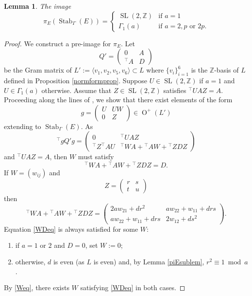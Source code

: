 \documentclass[11pt]{article}
\newtheorem{lem}[thm]{Lemma}
\newcommand{\ZZ}{\mathbb{Z}}
\newcommand{\la}{\langle}
\newcommand{\ra}{\rangle}
\newcommand{\opn}{\operatorname}
\newcommand{\beq}{\begin{equation*}}
\newcommand{\eeq}{\end{equation*}}
\newcommand{\bpm}{\begin{pmatrix}}
\newcommand{\epm}{\end{pmatrix}}
\begin{document}
\begin{lem}\label{piEimglem}
    The image
    \beq
    \pi_E(\opn{Stab}_{\Gamma}(E))
    =
    \begin{cases}
      \opn{SL}(2, \ZZ) & \text{if $a=1$} \\
      \Gamma_1(a) & \text{if $a=2, p$ or $2p$}.
    \end{cases}
    \eeq
    \end{lem}
  \begin{proof}
    We construct a pre-image for $\pi_E$.
    Let
    \beq
    Q'=
    \bpm 0 & A \\ {}^{\intercal}A & D \epm
    \eeq
    be the Gram matrix of $L':=\la v_1, v_2, v_5, v_6 \ra \subset L$ where $\{ v_i \}_{i=1}^6$ is the $\ZZ$-basis of $L$ defined in Proposition \ref{normformprop}.
    Suppose $U \in \opn{SL}(2, \ZZ)$ if $a=1$ and $U \in \Gamma_1(a)$ otherwise.
    Assume that $Z \in \opn{SL}(2, \ZZ)$ satisfies ${}^{\intercal}UAZ = A$.
    Proceeding along the lines of  \cite{Scattone},  we show that there exist elements of the form
  \beq
  g = \bpm U & UW \\ 0 & Z \epm \in \opn{O}^+(L')
  \eeq
  extending to $\opn{Stab}_{\Gamma}(E)$.
  As
  \beq
      {^{\intercal}}g Q' g =
      \bpm 0 & {^{\intercal}}UAZ \\
           {^{\intercal}}Z^{\intercal}AU & {^{\intercal}}WA +{^{\intercal}}AW + {^{\intercal}}ZDZ
           \epm
           \eeq
           and ${}^{\intercal}UAZ = A$, then $W$ must satisfy
           \begin{equation}\label{WDeq}
             {^{\intercal}}WA +{^{\intercal}}AW + {^{\intercal}}ZDZ = D.
             \end{equation}
If $W = (w_{ij})$ and
\beq
Z = \bpm r & s \\ t & u \epm
\eeq
then
 \begin{equation}\label{Weq}
{}^{\intercal}WA +{^{\intercal}}AW  +{^{\intercal}}ZDZ =
    \bpm
    2aw_{21} +dr^2 & aw_{22} + w_{11} + drs \\
    aw_{22} + w_{11} + drs  & 2w_{12} + ds^2
    \epm.
 \end{equation}
 Equation \eqref{WDeq} is always satisfied for some $W$: \begin{enumerate}
 \item if $a=1$ or $2$ and $D=0$, set $W:=0$;
 \item otherwise, $d$ is even (as $L$ is even) and, by  Lemma \ref{piEsublem},  $r^2 \equiv 1 \bmod{ a}$.
\end{enumerate}
 By \eqref{Weq}, there exists $W$ satisfying \eqref{WDeq} in both cases.

\end{proof}
\end{document}
